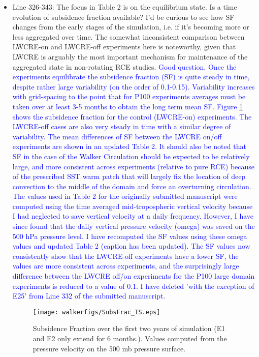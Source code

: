 \documentclass[draft]{agujournal2019}
\begin{document}
\begin{itemize}
  \item Line 326-343: The focus in Table 2 is on the equilibrium state. Is a time evolution of subsidence fraction available? I'd be curious to see how SF changes from the early stages of the simulation, i.e. if it's becoming more or less aggregated over time. The somewhat inconsistent comparison between LWCRE-on and LWCRE-off experiments here is noteworthy, given that LWCRE is arguably the most important mechanism for maintenance of the aggregated state in non-rotating RCE studies.
\textcolor{blue}{Good question.  Once the experiments equilibrate the subsidence fraction (SF) is quite steady in time, despite rather large variability (on the order of 0.1-0.15).   Variability increases with grid-spacing to the point that for P100 experiments averages must be taken over at least 3-5 months to obtain the long term mean SF.
Figure \ref{fig:subsfracTS}  
shows the subsidence fraction for the control (LWCRE-on) experiments.  The LWCRE-off cases are also very steady in time with a similar degree of variability.  The mean 
differences of SF between the LWCRE on/off experiments are shown in an updated Table 2.  It should also be noted that SF in the case of the Walker 
Circulation should be expected to be relatively large, and more consistent across experiments (relative to pure RCE) because of the prescribed SST warm 
patch that will largely fix the location of deep convection to the middle of the domain and force an overturning circulation.  
The values used in Table 2 for the originally submitted manuscript were computed 
using the time averaged mid-tropospheric vertical velocity because I had neglected to save vertical velocity at a daily frequency.  However, I have since 
found that the daily vertical pressure velocity (omega) was saved on the 500 hPa pressure level.  I have recomputed the SF values using these omega values
and updated Table 2 (caption has been updated).  The SF values now consistently show that the LWCRE-off experiments have a lower SF, the values are more consistent across experiments, and the surprisingly large difference between the LWCRE off/on experiments for the P100 large domain experiments is reduced to a value of 0.1.  I have deleted 'with the exception of E25' from Line 332 of the submitted manuscript.}

\begin{figure}
  \centering
    \texttt{[image: walkerfigs/SubsFrac\_TS.eps]}  
  \caption{Subsidence Fraction over the first two years of simulation (E1 and E2 only extend for 6 months.).  Values computed from the pressure 
  velocity on the 500 mb pressure surface.}
  \label{fig:subsfracTS}
\end{figure}  
  

\end{itemize}
\end{document}
